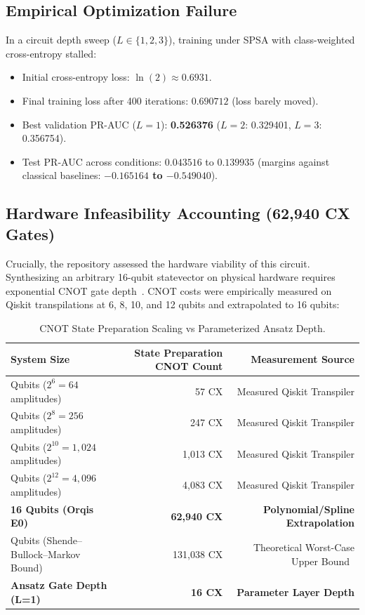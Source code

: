 \documentclass[11pt,a4paper]{report}
\begin{document}
\subsection{Empirical Optimization Failure}
In a circuit depth sweep ($L \in \{1, 2, 3\}$), training under SPSA with class-weighted cross-entropy stalled:
\begin{itemize}
  \item Initial cross-entropy loss: $\ln(2) \approx 0.6931$.
  \item Final training loss after 400 iterations: $0.690712$ (loss barely moved).
  \item Best validation PR-AUC ($L=1$): \textbf{0.526376} ($L=2$: 0.329401, $L=3$: 0.356754).
  \item Test PR-AUC across conditions: $0.043516$ to $0.139935$ (margins against classical baselines: \textbf{$-0.165164$ to $-0.549040$}).
\end{itemize}

\subsection{Hardware Infeasibility Accounting (62,940 CX Gates)}
Crucially, the repository assessed the hardware viability of this circuit. Synthesizing an arbitrary 16-qubit statevector on physical hardware requires exponential CNOT gate depth~\cite{shende2006synthesis}. CNOT costs were empirically measured on Qiskit transpilations at 6, 8, 10, and 12 qubits and extrapolated to 16 qubits:

\begin{table}[H]
\centering
\footnotesize
\setlength{\tabcolsep}{4pt}
\begin{tabularx}{\textwidth}{>{\raggedright\arraybackslash}X rr}
\toprule
\textbf{System Size} & \textbf{State Preparation CNOT Count} & \textbf{Measurement Source} \\
\midrule
6 Qubits ($2^6 = 64$ amplitudes) & 57 CX & Measured Qiskit Transpiler \\
8 Qubits ($2^8 = 256$ amplitudes) & 247 CX & Measured Qiskit Transpiler \\
10 Qubits ($2^{10} = 1,024$ amplitudes) & 1,013 CX & Measured Qiskit Transpiler \\
12 Qubits ($2^{12} = 4,096$ amplitudes) & 4,083 CX & Measured Qiskit Transpiler \\
\midrule
\textbf{16 Qubits (Orqis E0)} & \textbf{62,940 CX} & \textbf{Polynomial/Spline Extrapolation} \\
16 Qubits (Shende--Bullock--Markov Bound) & 131,038 CX & Theoretical Worst-Case Upper Bound~\cite{shende2006synthesis} \\
\textbf{Ansatz Gate Depth (L=1)} & \textbf{16 CX} & \textbf{Parameter Layer Depth} \\
\bottomrule
\end{tabularx}
\caption{CNOT State Preparation Scaling vs Parameterized Ansatz Depth.}
\label{tab:cx_scaling}
\end{table}
\end{document}
